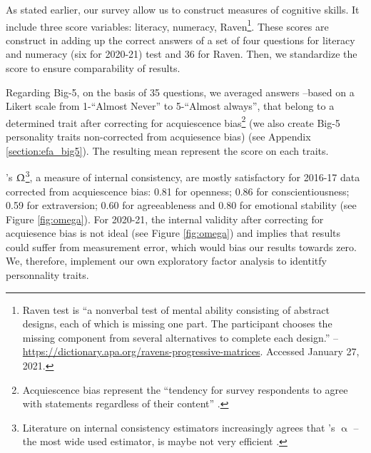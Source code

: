 \documentclass[a4paper, 11pt, onecolumn]{article}
\begin{document}
As stated earlier, our survey allow us to construct measures of cognitive skills.
It include three score variables: literacy, numeracy, Raven\footnote{Raven test is ``a nonverbal test of mental ability consisting of abstract designs, each of which is missing one part. The participant chooses the missing component from several alternatives to complete each design.'' -- \url{https://dictionary.apa.org/ravens-progressive-matrices}. Accessed January 27, 2021.}.
These scores are construct in adding up the correct answers of a set of four questions for literacy and numeracy (six for 2020-21) test and 36 for Raven.
Then, we standardize the score to ensure comparability of results.

Regarding Big-5, on the basis of 35 questions, we averaged answers --based on a Likert scale from 1-``Almost Never'' to 5-``Almost always'', that belong to a determined trait after correcting for acquiescence bias\footnote{Acquiescence bias represent the ``tendency for survey respondents to agree with statements regardless of their content'' \citep{Lavrakas2008}.} (we also create Big-5 personality traits non-corrected from acquiesence bias) (see Appendix \ref{section:efa_big5}).
The resulting mean represent the score on each traits.

\citeauthor{McDonald1999}'s $\Upomega$\footnote{Literature on internal consistency estimators increasingly agrees that \citeauthor{Cronbach1951}'s $\upalpha$ --the most wide used estimator, is maybe not very efficient \citep{Bourque2019, TrizanoHermosilla2016}.}, a measure of internal consistency, are mostly satisfactory for 2016-17 data corrected from acquiescence bias: 0.81 for openness; 0.86 for conscientiousness; 0.59 for extraversion; 0.60 for agreeableness and 0.80 for emotional stability (see Figure \ref{fig:omega}).
For 2020-21, the internal validity after correcting for acquiesence bias is not ideal (see Figure \ref{fig:omega}) and implies that results could suffer from measurement error, which would bias our results towards zero.
We, therefore, implement our own exploratory factor analysis to identitfy personnality traits.
\end{document}

